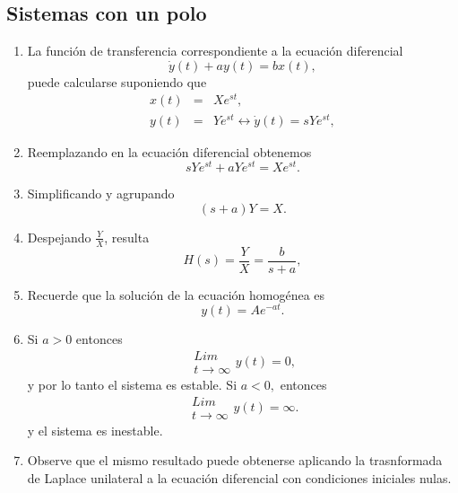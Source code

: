 \subsection{Sistemas con un polo}

\begin{enumerate}

\item La funci\'{o}n de transferencia correspondiente a la ecuaci\'{o}n diferencial 
\begin{equation}
        \dot{y}\left( t\right) +ay\left( t\right) =bx\left( t\right) ,
\end{equation}
puede calcularse suponiendo que 
\begin{eqnarray}
        x\left( t\right) &=&Xe^{st}, \\
        y\left( t\right) &=&Ye^{st}\longleftrightarrow \dot{y}\left( t\right)=sYe^{st},
\end{eqnarray}

\item Reemplazando en la ecuaci\'{o}n diferencial obtenemos
\begin{equation}
        sYe^{st}+aYe^{st}=Xe^{st}.
\end{equation}

\item Simplificando y agrupando 
\begin{equation}
        \left( s+a\right) Y=X.
\end{equation}

\item Despejando $\frac{Y}{X}$, resulta 
\begin{equation}
        H\left( s\right) =\frac{Y}{X}=\frac{b}{s+a},
\end{equation}

\item Recuerde que la soluci\'{o}n de la ecuaci\'{o}n homog\'{e}nea es 
\begin{equation}
        y\left( t\right) =Ae^{-at}.
\end{equation}

\item Si $a>0$ entonces 
\begin{equation}
        \begin{array}{c}
                Lim \\ 
                t\rightarrow \infty
        \end{array}
        y\left( t\right) =0,
\end{equation}
y por lo tanto el sistema es estable. Si $a<0,$ entonces 
\begin{equation}
        \begin{array}{c}
                Lim \\ 
                t\rightarrow \infty
        \end{array}
        y\left( t\right) =\infty .
\end{equation}
y el sistema es inestable.

\item Observe que el mismo resultado puede obtenerse aplicando la trasnformada de Laplace unilateral
a la ecuaci\'{o}n diferencial con condiciones iniciales nulas.

\end{enumerate}

